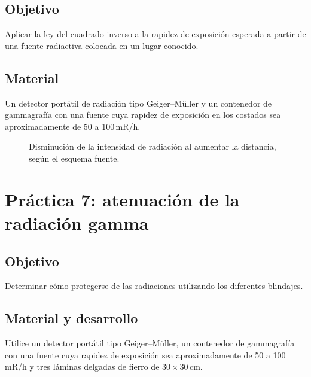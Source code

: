 \subsection*{Objetivo}
Aplicar la ley del cuadrado inverso a la rapidez de exposición esperada a partir de una fuente radiactiva colocada en un lugar conocido.

\subsection*{Material}
Un detector portátil de radiación tipo Geiger--Müller y un contenedor de gammagrafía con una fuente cuya rapidez de exposición en los costados sea aproximadamente de 50 a 100\,mR/h.

\begin{figure}[htbp]
  \centering
  \caption{Disminución de la intensidad de radiación al aumentar la distancia, según el esquema fuente.}
  \label{fig:practica6-cuadrado-inverso}
\end{figure}

\section{Práctica 7: atenuación de la radiación gamma}

\subsection*{Objetivo}
Determinar cómo protegerse de las radiaciones utilizando los diferentes blindajes.

\subsection*{Material y desarrollo}
Utilice un detector portátil tipo Geiger--Müller, un contenedor de gammagrafía con una fuente cuya rapidez de exposición sea aproximadamente de 50 a 100\,mR/h y tres láminas delgadas de fierro de $30\times30$\,cm.

